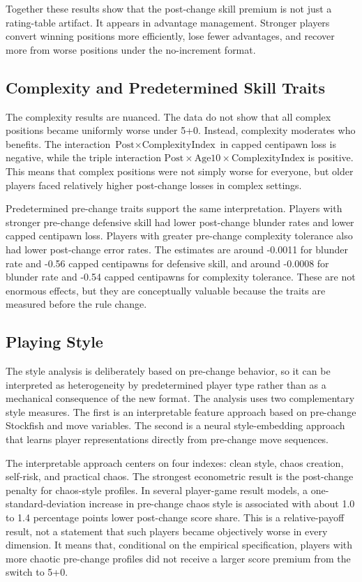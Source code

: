Together these results show that the post-change skill premium is not just a rating-table artifact. It appears in advantage management. Stronger players convert winning positions more efficiently, lose fewer advantages, and recover more from worse positions under the no-increment format.

\subsection{Complexity and Predetermined Skill Traits}

The complexity results are nuanced. The data do not show that all complex positions became uniformly worse under 5+0. Instead, complexity moderates who benefits. The interaction \(\text{Post} \times \text{ComplexityIndex}\) in capped centipawn loss is negative, while the triple interaction \(\text{Post} \times \text{Age10} \times \text{ComplexityIndex}\) is positive. This means that complex positions were not simply worse for everyone, but older players faced relatively higher post-change losses in complex settings.

Predetermined pre-change traits support the same interpretation. Players with stronger pre-change defensive skill had lower post-change blunder rates and lower capped centipawn loss. Players with greater pre-change complexity tolerance also had lower post-change error rates. The estimates are around -0.0011 for blunder rate and -0.56 capped centipawns for defensive skill, and around -0.0008 for blunder rate and -0.54 capped centipawns for complexity tolerance. These are not enormous effects, but they are conceptually valuable because the traits are measured before the rule change.

\subsection{Playing Style}
\label{sec:playing-style}

The style analysis is deliberately based on pre-change behavior, so it can be interpreted as heterogeneity by predetermined player type rather than as a mechanical consequence of the new format. The analysis uses two complementary style measures. The first is an interpretable feature approach based on pre-change Stockfish and move variables. The second is a neural style-embedding approach that learns player representations directly from pre-change move sequences.

The interpretable approach centers on four indexes: clean style, chaos creation, self-risk, and practical chaos. The strongest econometric result is the post-change penalty for chaos-style profiles. In several player-game result models, a one-standard-deviation increase in pre-change chaos style is associated with about 1.0 to 1.4 percentage points lower post-change score share. This is a relative-payoff result, not a statement that such players became objectively worse in every dimension. It means that, conditional on the empirical specification, players with more chaotic pre-change profiles did not receive a larger score premium from the switch to 5+0.


